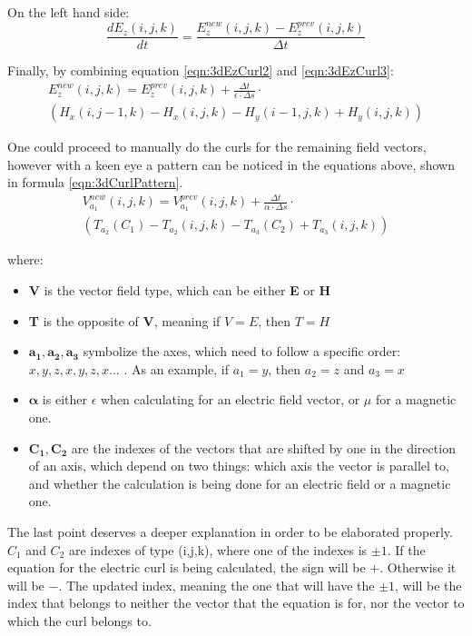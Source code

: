 On the left hand side:
\begin{equation}
	\label{eqn:3dEzCurl3}
	\frac{d E_z(i,j,k)}{dt} = \frac{E_z^{new}(i,j,k) - E_z^{prev}(i,j,k)}{\Delta t}
\end{equation}

Finally, by combining equation \ref{eqn:3dEzCurl2} and \ref{eqn:3dEzCurl3}:
\begin{multline}
	\label{eqn:3dEzCurlFinal}
	E_z^{new}(i,j,k) =  E_z^{prev}(i,j,k) + \frac{\Delta t}{\epsilon \cdot \Delta s} \cdot \\ (H_x(i,j-1,k) - H_x(i,j,k) - H_y(i-1,j,k) + H_y(i,j,k))
\end{multline}

One could proceed to manually do the curls for the remaining field vectors, however with a keen eye a pattern can be noticed in the equations above, shown in formula \ref{eqn:3dCurlPattern}.
\begin{multline}
	\label{eqn:3dCurlPattern}
	V_{a_1}^{new}(i,j,k) =  V_{a_1}^{prev}(i,j,k) + \frac{\Delta t}{\alpha \cdot \Delta s} \cdot \\ (T_{a_2}(C_1) - T_{a_2}(i,j,k) - T_{a_3}(C_2) + T_{a_3}(i,j,k))
\end{multline}

where:

\begin{itemize}
	\item \textbf{V} is the vector field type, which can be either \textbf{E} or \textbf{H}
	\item \textbf{T} is the opposite of \textbf{V}, meaning if $V = E$, then $T = H$
	\item $\boldsymbol{a_1,a_2,a_3}$ symbolize the axes, which need to follow a specific order: $x,y,z,x,y,z,x...$ . As an example, if $a_1 = y$, then $a_2 = z$ and $a_3 = x$
	\item $\boldsymbol{\alpha}$ is either $\epsilon$ when calculating for an electric field vector, or $\mu$ for a magnetic one.
	\item $\boldsymbol{C_1, C_2}$ are the indexes of the vectors that are shifted by one in the direction of an axis, which depend on two things: which axis the vector is parallel to, and whether the calculation is being done for an electric field or a magnetic one.
\end{itemize}

The last point deserves a deeper explanation in order to be elaborated properly. $C_1$ and $C_2$ are indexes of type (i,j,k), where one of the indexes is $\pm1$. If the equation for the electric curl is being calculated, the sign will be $+$. Otherwise it will be $-$. The updated index, meaning the one that will have the $\pm1$, will be the index that belongs to neither the vector that the equation is for, nor the vector to which the curl belongs to.

